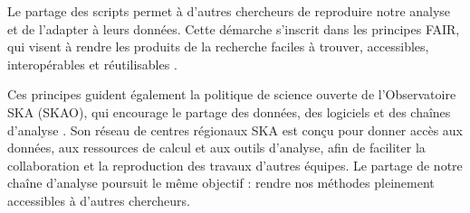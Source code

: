 Le partage des scripts permet à d'autres chercheurs de reproduire notre analyse et de l'adapter à leurs données. Cette démarche s'inscrit dans les principes FAIR, qui visent à rendre les produits de la recherche faciles à trouver, accessibles, interopérables et réutilisables \citep{Wilkinson2016}.

Ces principes guident également la politique de science ouverte de l'Observatoire SKA (SKAO), qui encourage le partage des données, des logiciels et des chaînes d'analyse \citep{SKAOOpenScience}. Son réseau de centres régionaux SKA est conçu pour donner accès aux données, aux ressources de calcul et aux outils d'analyse, afin de faciliter la collaboration et la reproduction des travaux d'autres équipes. Le partage de notre chaîne d'analyse poursuit le même objectif : rendre nos méthodes pleinement accessibles à d'autres chercheurs.
\newpage
